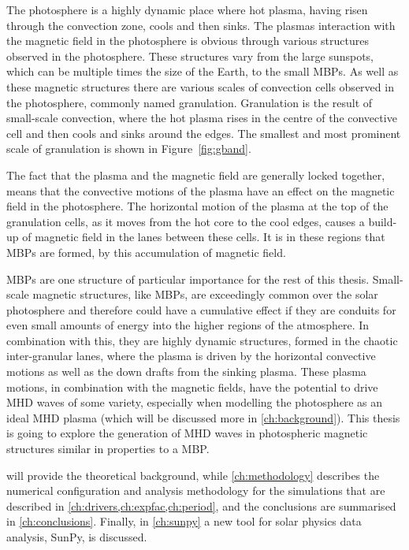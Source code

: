 \documentclass[a4paper,12pt,fourier,authoryear,custommargin]{Classes/PhDThesisPSnPDF}
\begin{document}
The photosphere is a highly dynamic place where hot plasma, having risen through the convection zone, cools and then sinks.
The plasmas interaction with the magnetic field in the photosphere is obvious through various structures observed in the photosphere.
These structures vary from the large sunspots, which can be multiple times the size of the Earth, to the small MBPs. %
As well as these magnetic structures there are various scales of convection cells observed in the photosphere, commonly named granulation.
Granulation is the result of small-scale convection, where the hot plasma rises in the centre of the convective cell and then cools and sinks around the edges.
The smallest and most prominent scale of granulation is shown in Figure~\ref{fig:gband}.

The fact that the plasma and the magnetic field are generally locked together, means that the convective motions of the plasma have an effect on the magnetic field in the photosphere.
The horizontal motion of the plasma at the top of the granulation cells, as it moves from the hot core to the cool edges, causes a build-up of magnetic field in the lanes between these cells.
It is in these regions that MBPs are formed, by this accumulation of magnetic field. \citep{shelyag2004,keys2013}

MBPs are one structure of particular importance for the rest of this thesis.
Small-scale magnetic structures, like MBPs, are exceedingly common over the solar photosphere and therefore could have a cumulative effect if they are conduits for even small amounts of energy into the higher regions of the atmosphere.
In combination with this, they are highly dynamic structures, formed in the chaotic inter-granular lanes, where the plasma is driven by the horizontal convective motions as well as the down drafts from the sinking plasma.
These plasma motions, in combination with the magnetic fields, have the potential to drive MHD waves of some variety, especially when modelling the photosphere as an ideal MHD plasma (which will be discussed more in \cref{ch:background}).
This thesis is going to explore the generation of MHD waves in photospheric magnetic structures similar in properties to a MBP.

 will provide the theoretical background, while \cref{ch:methodology} describes the numerical configuration and analysis methodology for the simulations that are described in \cref{ch:drivers,ch:expfac,ch:period}, and the conclusions are summarised in \cref{ch:conclusions}.
Finally, in \cref{ch:sunpy} a new tool for solar physics data analysis, SunPy, is discussed.
\clearpage{}%
%
\end{document}
